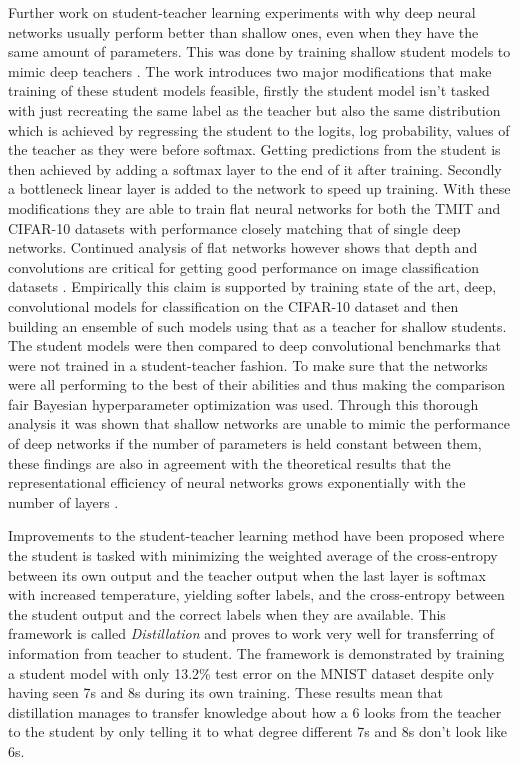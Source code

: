 \documentclass{kththesis}
\newcommand{\bibentry}[1]{\parencite{#1}}
\begin{document}
Further work on student-teacher learning experiments with why deep neural
networks usually perform better than shallow ones, even when they have the same
amount of parameters. This was done by training shallow student models to mimic
deep teachers \bibentry{ba2014deep}. The work introduces two major modifications
that make training of these student models feasible, firstly the student model
isn't tasked with just recreating the same label as the teacher but also the
same distribution which is achieved by regressing the student to the logits, log
probability, values of the teacher as they were before softmax. Getting
predictions from the student is then achieved by adding a softmax layer to the
end of it after training. Secondly a bottleneck linear layer is added to the
network to speed up training. With these modifications they are able to train
flat neural networks for both the TMIT and CIFAR-10 datasets with performance
closely matching that of single deep networks. Continued analysis of flat
networks however shows that depth and convolutions are critical for getting good
performance on image classification datasets \bibentry{urban2016deep}.
Empirically this claim is supported by training state of the art, deep,
convolutional models for classification on the CIFAR-10 dataset and then
building an ensemble of such models using that as a teacher for shallow
students. The student models were then compared to deep convolutional benchmarks
that were not trained in a student-teacher fashion. To make sure that the
networks were all performing to the best of their abilities and thus making the
comparison fair Bayesian hyperparameter optimization
\bibentry{snoek2012practical} was used. Through this thorough analysis it was
shown that shallow networks are unable to mimic the performance of deep networks
if the number of parameters is held constant between them, these findings are
also in agreement with the theoretical results that the representational
efficiency of neural networks grows exponentially with the number of layers
\bibentry{liang2016deep}. 

Improvements to the student-teacher learning method have been proposed where the
student is tasked with minimizing the weighted average of the cross-entropy
between its own output and the teacher output when the last layer is softmax
with increased temperature, yielding softer labels, and the cross-entropy
between the student output and the correct labels when they are available. This
framework is called \emph{Distillation} \bibentry{hinton2015distilling} and
proves to work very well for transferring of information from teacher to
student. The framework is demonstrated by training a student model with only
13.2\% test error on the MNIST dataset despite only having seen 7s and 8s during
its own training. These results mean that distillation manages to transfer
knowledge about how a 6 looks from the teacher to the student by only telling it
to what degree different 7s and 8s don't look like 6s. 
\end{document}

